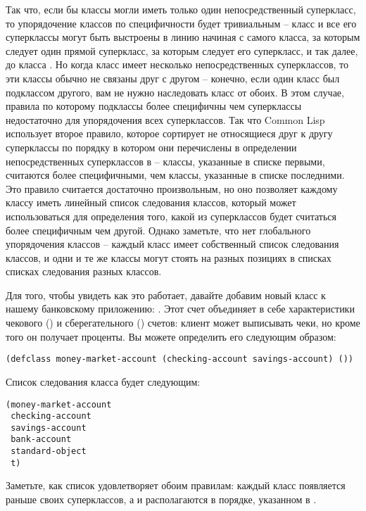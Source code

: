 Так что, если бы классы могли иметь только один непосредственный суперкласс, то
упорядочение классов по специфичности будет тривиальным -- класс и все его суперклассы
могут быть выстроены в линию начиная с самого класса, за которым следует один прямой
суперкласс, за которым следует его суперкласс, и так далее, до класса .  Но когда
класс имеет несколько непосредственных суперклассов, то эти классы обычно не связаны друг
с другом -- конечно, если один класс был подклассом другого, вам не нужно наследовать
класс от обоих.  В этом случае, правила по которому подклассы более специфичны чем
суперклассы недостаточно для упорядочения всех суперклассов.  Так что Common Lisp
использует второе правило, которое сортирует не относящиеся друг к другу суперклассы по
порядку в котором они перечислены в определении непосредственных суперклассов в
 -- классы, указанные в списке первыми, считаются более специфичными, чем
классы, указанные в списке последними.  Это правило считается достаточно произвольным, но
оно позволяет каждому классу иметь линейный список следования классов, который может
использоваться для определения того, какой из суперклассов будет считаться более
специфичным чем другой.  Однако заметьте, что нет глобального упорядочения классов --
каждый класс имеет собственный список следования классов, и одни и те же классы могут
стоять на разных позициях в списках списках следования разных классов.

Для того, чтобы увидеть как это работает, давайте добавим новый класс к нашему банковскому
приложению: .  Этот счет объединяет в себе характеристики
чекового () и сберегательного () счетов:
клиент может выписывать чеки, но кроме того он получает проценты.  Вы можете определить
его следующим образом:

\begin{lstlisting}
(defclass money-market-account (checking-account savings-account) ())
\end{lstlisting}

Список следования класса  будет следующим:

\begin{lstlisting}
(money-market-account
 checking-account
 savings-account
 bank-account
 standard-object
 t)
\end{lstlisting}

Заметьте, как список удовлетворяет обоим правилам: каждый класс появляется раньше своих
суперклассов, а  и  располагаются в порядке,
указанном в .

